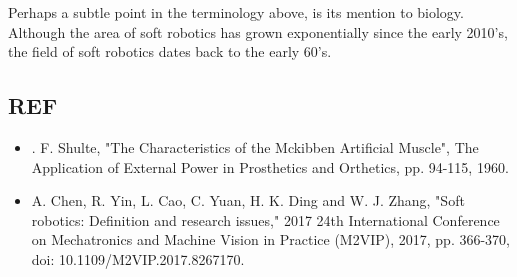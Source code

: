 Perhaps a subtle point in the terminology above, is its mention to biology.
Although the area of soft robotics has grown exponentially since the early 2010's, the field of soft robotics dates back to the early 60's.

% 

\subsection{REF}

\begin{itemize}
  \item . F. Shulte, "The Characteristics of the Mckibben Artificial Muscle", The Application of External Power in Prosthetics and Orthetics, pp. 94-115, 1960.
  \item A. Chen, R. Yin, L. Cao, C. Yuan, H. K. Ding and W. J. Zhang, "Soft robotics: Definition and research issues," 2017 24th International Conference on Mechatronics and Machine Vision in Practice (M2VIP), 2017, pp. 366-370, doi: 10.1109/M2VIP.2017.8267170.
\end{itemize}
